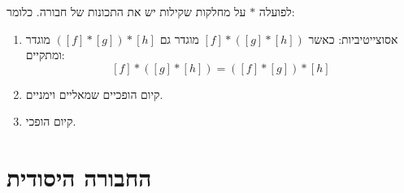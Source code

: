 \documentclass{tstextbook}
\begin{document}
\begin{proposition}
לפועלה \(*\) על מחלקות שקילות יש את התכונות של חבורה. כלומר:

  \begin{enumerate}
    \item אסוצייטיביות: כאשר \([f]*([g]*[h])\) מוגדר גם \(([f]*[g])*[h]\) מוגדר ומתקיים: 
$$[f]*([g]*[h])=([f]*[g])*[h]$$


    \item קיום הופכיים שמאליים וימניים. 


    \item קיום הופכי. 


  \end{enumerate}
\end{proposition}
\section{החבורה היסודית}
\end{document}
